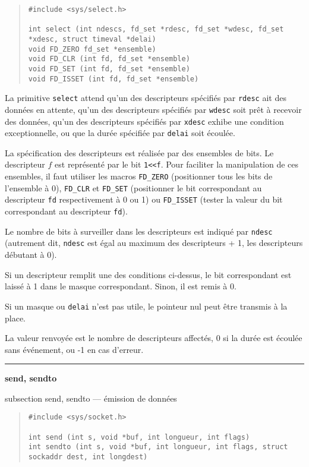 \documentclass [twoside] {report}
\newcommand {\primitive} [1]
    {
	\phantomsection
	{\large \bf #1}
	\addcontentsline {toc} {subsection} {#1}
    }
\newcommand {\separation}
    {
	\vspace {5mm}
	\nopagebreak
	\hrule
    }
\begin{document}
\begin {quote}
\begin {verbatim}
#include <sys/select.h>

int select (int ndescs, fd_set *rdesc, fd_set *wdesc, fd_set *xdesc, struct timeval *delai)
void FD_ZERO fd_set *ensemble)
void FD_CLR (int fd, fd_set *ensemble)
void FD_SET (int fd, fd_set *ensemble)
void FD_ISSET (int fd, fd_set *ensemble)

\end{verbatim}
\end {quote}

La primitive {\tt select} attend qu'un des descripteurs
spécifiés par {\tt rdesc} ait des données en attente, qu'un
des descripteurs spécifiés par {\tt wdesc} soit prêt à
recevoir des données, qu'un des descripteurs spécifiés par
{\tt xdesc} exhibe une condition exceptionnelle, ou
que la durée spécifiée par {\tt delai} soit écoulée.

La spécification des descripteurs est réalisée par des ensembles
de bits. Le descripteur $f$ est représenté par le bit \verb|1<<f|.
Pour faciliter la manipulation de ces ensembles, il faut utiliser les
macros \texttt {FD\_ZERO} (positionner tous les bits de l'ensemble à 0),
\texttt {FD\_CLR} et \texttt {FD\_SET} (positionner le bit correspondant
au descripteur \texttt {fd} respectivement à 0 ou 1) ou \texttt
{FD\_ISSET} (tester la valeur du bit correspondant au descripteur \texttt
{fd}).

Le nombre de bits à surveiller dans les descripteurs est
indiqué par \texttt {ndesc} (autrement dit, \texttt {ndesc}
est égal au maximum des descripteurs + 1, les descripteurs
débutant à 0).

Si un descripteur remplit une des conditions ci-dessus, le
bit correspondant est laissé à 1 dans le masque
correspondant. Sinon, il est remis à 0.

Si un masque ou {\tt delai} n'est pas utile, le pointeur
nul peut être transmis à la place.

La valeur renvoyée est le nombre de descripteurs affectés,
0 si la durée est écoulée sans événement, ou -1 en cas
d'erreur.



\separation
\primitive {send, sendto} --- émission de données

\begin {quote}
\begin {verbatim}
#include <sys/socket.h>

int send (int s, void *buf, int longueur, int flags)
int sendto (int s, void *buf, int longueur, int flags, struct sockaddr dest, int longdest)
\end{verbatim}
\end {quote}
\end{document}
